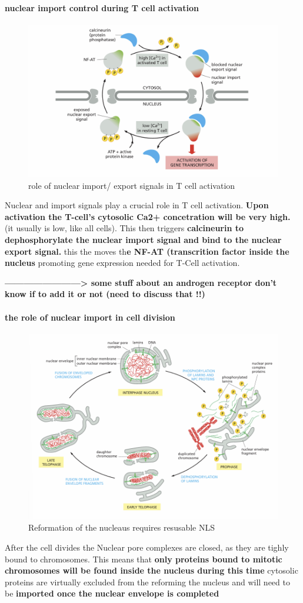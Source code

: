 \documentclass[../main.tex]{subfiles}
\begin{document}
\paragraph{nuclear import control during T cell activation}
\begin{figure}[H]
    \centering
    \includegraphics[width=0.5\linewidth]{TCells.png}
    \caption{role of nuclear import/ export signals in T cell activation}
    \label{fig:enter-label}
\end{figure}

Nuclear and import signals play a crucial role in T cell activation. \textbf{Upon activation the T-cell's cytosolic Ca2+ concetration will be very high.} (it usually is low, like all cells). This then triggers \textbf{\gls{calcineurin} to dephosphorylate the nuclear import signal and bind to the nuclear export signal.} this the moves th\textbf{e NF-AT (transcrition factor inside the nucleus} promoting gene expression needed for T-Cell activation.


\textbf{------------------------> some stuff about an androgen receptor don't know if to add it or not (need to discuss that !!)}

\paragraph{the role of nuclear import in cell division}
\begin{figure}[H]
    \centering
    \includegraphics[width=0.5\linewidth]{NuclearReforming.png}
    \caption{Reformation of the nucleaus requires resusable NLS}
    \label{fig:enter-label}
\end{figure}
After the cell divides the Nuclear pore complexes are closed, as they are tighly bound to chromosomes. This means that \textbf{only proteins bound to mitotic chromosomes will be found inside the nucleus during this time} cytosolic proteins are virtually excluded from the reforming the nucleus and will need to be \textbf{imported once the nuclear envelope is completed}
\end{document}
